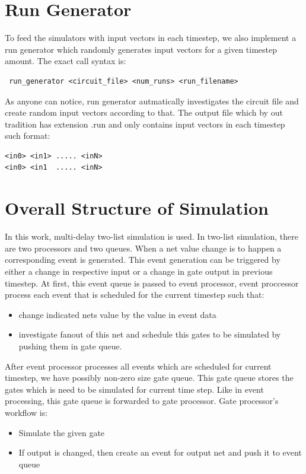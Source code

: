 \documentclass[a4paper,onesided,12pt]{report}
\begin{document}
 
 \section{Run Generator}
 
 To feed the simulators with input vectors in each timestep, we also implement a run generator which randomly generates input vectors for a given timestep amount. The exact call syntax is:
 \begin{verbatim}
 run_generator <circuit_file> <num_runs> <run_filename>
 \end{verbatim}
 As anyone can notice, run generator autmatically investigates the circuit file and create random input vectors according to that. The output file which by out tradition has extension .run and only contains input vectors in each timestep such format:
\begin{verbatim}
<in0> <in1> ..... <inN>
<in0> <in1  ..... <inN>
\end{verbatim}

 \section{Overall Structure of Simulation}
 In this work, multi-delay two-list simulation is used. In two-list simulation, there are two processors and two queues. When a net value change is to happen a corresponding event is generated. This event generation can be triggered by either a change in respective input or a change in gate output in previous timestep. At first, this event queue is passed to event processor, event proccessor process each event that is scheduled for the current timestep such that:
 \begin{itemize}
 \item change indicated nets value by the value in event data
 \item investigate fanout of this net and schedule this gates to be simulated by pushing them in gate queue.
 \end{itemize} 
 
 After event processor processes all events which are scheduled for current timestep, we have possibly non-zero size gate queue. This gate queue stores the gates which is need to be simulated for current time step. Like in event processing, this gate queue is forwarded to gate processor. Gate processor's workflow is:
 \begin{itemize}
 \item Simulate the given gate
 \item If output is changed, then create an event for output net and push it to event queue
 \end{itemize}
 
\end{document}
